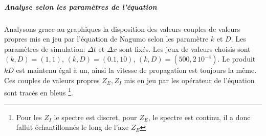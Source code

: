             \subparagraph{Analyse selon les paramètres de l'équation}
            Analysons grace au graphiques  la disposition des valeurs couples de valeurs 
            propres mis en jeu par l'équation de Nagumo selon les paramètre $k$ et $D$. Les paramètres de simulation: $\Delta t$ et $\Delta x$ sont fixés.
            Les jeux de valeurs choisis sont $(k,D)=(1,1)$, $(k,D)=(0.1,10)$, $(k,D)=(500,2\, 10^{-4})$. 
            Le produit $kD$ est maintenu égal à un, ainsi la vitesse de propagation est toujours la même.
            Ces couples de valeurs propres $Z_E,Z_I$ mis en jeu par les opérateur de l'équation sont tracés en bleus
            \footnote{Pour les $Z_I$ le spectre est discret, pour $Z_E$, le spectre est continu, il a donc fallut échantillonnés le long de l'axe $Z_E$}.

